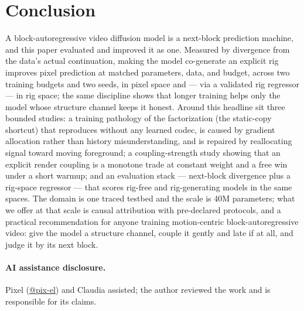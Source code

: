\documentclass[10pt,twocolumn]{article}
\begin{document}
\section{Conclusion}
A block-autoregressive video diffusion model is a next-block prediction machine, and this paper evaluated and
improved it as one. Measured by divergence from the data's actual continuation, making the model co-generate an
explicit rig improves pixel prediction at matched parameters, data, and budget, across two training budgets and two
seeds, in pixel space and — via a validated rig regressor — in rig space; the same discipline shows that longer
training helps only the model whose structure channel keeps it honest. Around this headline sit three bounded
studies: a training pathology of the factorization (the static-copy shortcut) that reproduces without any learned
codec, is caused by gradient allocation rather than history misunderstanding, and is repaired by reallocating signal
toward moving foreground; a coupling-strength study showing that an explicit render coupling is a monotone trade at
constant weight and a free win under a short warmup; and an evaluation stack — next-block divergence plus a
rig-space regressor — that scores rig-free and rig-generating models in the same spaces. The domain is one traced
testbed and the scale is 40M parameters; what we offer at that scale is causal attribution with pre-declared
protocols, and a practical recommendation for anyone training motion-centric block-autoregressive video: give the
model a structure channel, couple it gently and late if at all, and judge it by its next block.

\paragraph{AI assistance disclosure.} Pixel (\href{https://sprited.ai}{@pix-el}) and Claudia assisted; the author
reviewed the work and is responsible for its claims.
\end{document}
